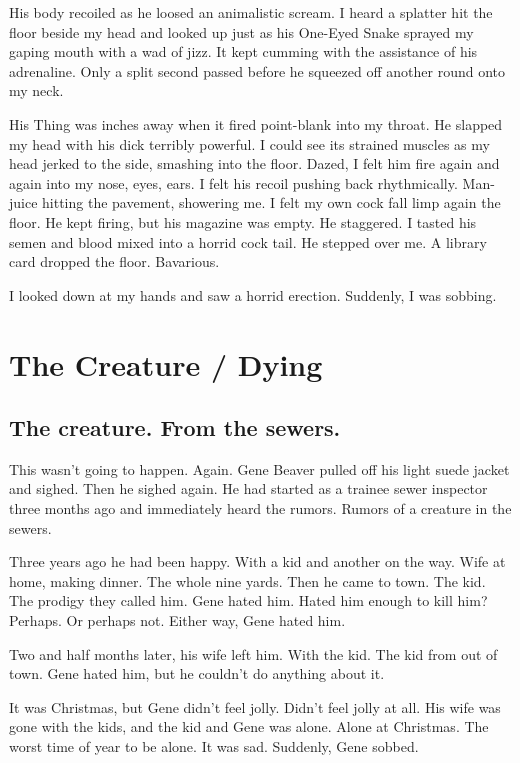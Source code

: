 His body recoiled as he loosed an animalistic scream. I heard a
splatter hit the floor beside my head and looked up just as his
One-Eyed Snake sprayed my gaping mouth with a wad of jizz. It kept
cumming with the assistance of his adrenaline. Only a split second
passed before he squeezed off another round onto my neck.



His Thing was inches away when it fired point-blank into my throat.
He slapped my head with his dick terribly powerful. I could see its
strained muscles as my head jerked to the side, smashing into the
floor. Dazed, I felt him fire again and again into my nose, eyes,
ears. I felt his recoil pushing back rhythmically. Man-juice
hitting the pavement, showering me. I felt my own cock fall limp
again the floor. He kept firing, but his magazine was empty. He
staggered. I tasted his semen and blood mixed into a horrid cock
tail. He stepped over me. A library card dropped the floor.
Bavarious.



I looked down at my hands and saw a horrid erection. Suddenly, I
was sobbing. 
 



\chapter{The Creature / Dying}


\section*{The creature. From the sewers.}

This wasn't going to happen. Again. Gene Beaver pulled off his light
suede jacket and sighed. Then he sighed again. He had started as a
trainee sewer inspector three months ago and immediately heard the
rumors. Rumors of a creature in the sewers.

Three years ago he had been happy. With a kid and another on the
way. Wife at home, making dinner. The whole nine yards. Then he came to
town. The kid. The prodigy they called him. Gene hated him. Hated him
enough to kill him? Perhaps. Or perhaps not. Either way, Gene hated him.

Two and half months later, his wife left him. With the kid. The kid from
out of town. Gene hated him, but he couldn't do anything about it.

It was Christmas, but Gene didn't feel jolly. Didn't feel jolly at
all. His wife was gone with the kids, and the kid and Gene was
alone. Alone at Christmas. The worst time of year to be alone. It was
sad. Suddenly, Gene sobbed.

